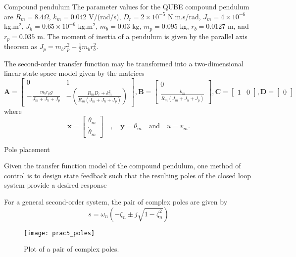 \documentclass[9pt]{beamer-control}
\begin{document}
\begin{frame}{Compound pendulum}
The parameter values for the QUBE compound pendulum are $R_m=8.4\Omega$, $k_m=0.042$ V/(rad/s), $D_r=2\times 10^{-5}$ N.m.s/rad, $J_m = 4\times 10^{-6}$ kg.m$^2$, $J_h = 0.65 \times 10^{-6}$ kg.m$^2$, $m_b=0.03$ kg, $m_p=0.095$ kg, $r_b = 0.0127$ m, and $r_p = 0.035$ m.
The moment of inertia of a pendulum is given by the parallel axis theorem as $J_p = m_b r_p^2+ \tfrac{1}{2}m_b r_b^2$.

The second-order transfer function may be transformed into a two-dimensional linear state-space model given by the matrices
\[
\mathbf{A}=\begin{bmatrix}
	0 & 1 \\
	-\tfrac{m_br_p g }{J_m+J_h+J_p} & -\left(\tfrac{R_m D_r + k_m^2}{R_m(J_m+J_h+J_p)}\right)
\end{bmatrix},
\mathbf{B} = \begin{bmatrix}
	0 \\ \tfrac{k_m}{R_m(J_m+J_h+J_p)}
\end{bmatrix}, 
\mathbf{C} = \begin{bmatrix}
	1 & 0
\end{bmatrix},
\mathbf{D} = \begin{bmatrix}
	0
\end{bmatrix}
\]  
where 
\[\mathbf{x} = \begin{bmatrix}
	\theta_m \\ \dot{\theta}_m
\end{bmatrix}
\quad , \quad \mathbf{y} = \theta_m \quad  \text{and} \quad u=v_m.\]
\end{frame}




\begin{frame}{Pole placement}

Given the transfer function model of the compound pendulum, one method of control is to design state feedback such that the resulting poles of the closed loop system provide a desired response

For a general second-order system, the pair of complex poles are given by  
\[s=\omega_n (-\zeta_n \pm j \sqrt{1-\zeta_n^2})\]

\begin{figure}
	\centering
	\texttt{[image: prac5\_poles]}
	\caption{Plot of a pair of complex poles.}
\end{figure}


\end{frame}
\end{document}
